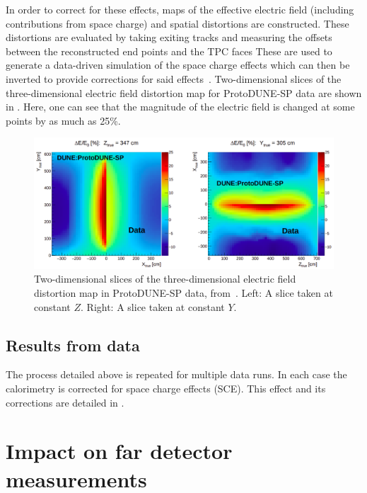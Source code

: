 In order to correct for these effects, maps of the effective electric field (including contributions from space charge) and spatial distortions are constructed.
These distortions are evaluated by taking exiting tracks and measuring the offsets between the reconstructed end points and the TPC faces
These are used to generate a data-driven simulation of the space charge effects which can then be inverted to provide corrections for said effects~\cite{protodunePerformance}.
Two-dimensional slices of the three-dimensional electric field distortion map for ProtoDUNE-SP data are shown in . 
Here, one can see that the magnitude of the electric field is changed at some points by as much as 25\%.

\begin{figure}[h]
	\centering
	\includegraphics[width=.9\linewidth]{files/figures/protodune_calibration/eFieldDistortion}
	\caption[Two-dimensional slices of the three-dimensional electric field distortion map in ProtoDUNE-SP data]{Two-dimensional slices of the three-dimensional electric field distortion map in ProtoDUNE-SP data, from~\cite{protodunePerformance}. Left: A slice taken at constant $Z$. Right: A slice taken at constant $Y$.}
	\label{fig:eFieldDistortion}
\end{figure}

\subsection{Results from data}
\label{sec:pdune_calibration:lifetime:data}

The process detailed above is repeated for multiple data runs.
In each case the calorimetry is corrected for space charge effects (SCE). 
This effect and its corrections are detailed in .

\section{Impact on far detector measurements}
\label{sec:pdune_calibration:fd}